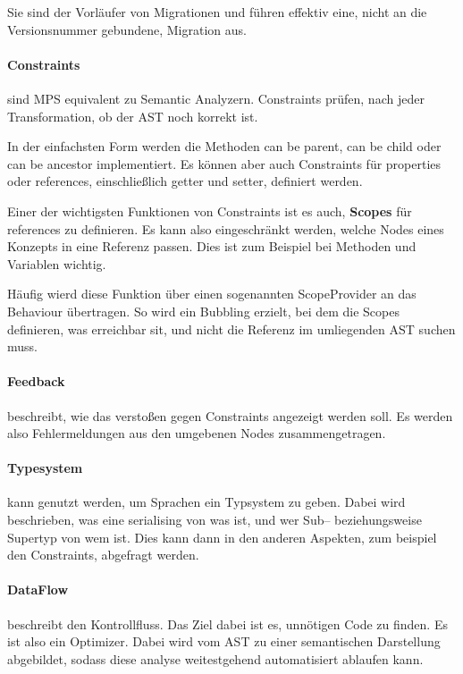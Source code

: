 Sie sind der Vorläufer von Migrationen und führen effektiv eine, nicht an die Versionsnummer gebundene, Migration aus.

\paragraph{Constraints} sind \ac{MPS} equivalent zu Semantic Analyzern.
Constraints prüfen, nach jeder Transformation, ob der \ac{AST} noch korrekt ist.

In der einfachsten Form werden die Methoden {\ttfamily can be parent}, {\ttfamily can be child} oder {\ttfamily can be ancestor} implementiert.
Es können aber auch Constraints für {\ttfamily properties} oder {\ttfamily references}, einschließlich getter und setter, definiert werden.

Einer der wichtigsten Funktionen von Constraints ist es auch, \textbf{Scopes} für {\ttfamily references} zu definieren.
Es kann also eingeschränkt werden, welche Nodes eines Konzepts in eine Referenz passen.
Dies ist zum Beispiel bei Methoden und Variablen wichtig.

Häufig wierd diese Funktion über einen sogenannten {\ttfamily ScopeProvider} an das Behaviour übertragen.
So wird ein Bubbling erzielt, bei dem die Scopes definieren, was erreichbar sit, und nicht die Referenz im umliegenden \ac{AST} suchen muss.

\paragraph{Feedback} beschreibt, wie das verstoßen gegen Constraints angezeigt werden soll.
Es werden also Fehlermeldungen aus den umgebenen Nodes zusammengetragen.

\paragraph{Typesystem} kann genutzt werden, um Sprachen ein Typsystem zu geben.
Dabei wird beschrieben, was eine serialising von was ist, und wer Sub-- beziehungsweise Supertyp von wem ist.
Dies kann dann in den anderen Aspekten, zum beispiel den Constraints, abgefragt werden.

\paragraph{DataFlow} beschreibt den Kontrollfluss.
Das Ziel dabei ist es, unnötigen Code zu finden.
Es ist also ein Optimizer.
Dabei wird vom \ac{AST} zu einer semantischen Darstellung abgebildet, sodass diese analyse weitestgehend automatisiert ablaufen kann.

